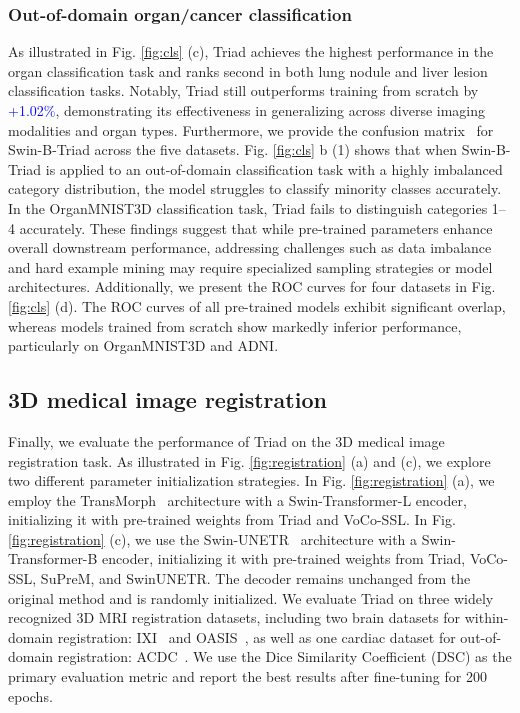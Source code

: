 \subsubsection{Out-of-domain organ/cancer classification}
As illustrated in Fig. \ref{fig:cls} (c), Triad achieves the highest performance in the organ classification task and ranks second in both lung nodule and liver lesion classification tasks.
Notably, Triad still outperforms training from scratch by \textcolor{blue}{+1.02\%}, demonstrating its effectiveness in generalizing across diverse imaging modalities and organ types.
Furthermore, we provide the confusion matrix~\cite{heydarian2022mlcm} for Swin-B-Triad across the five datasets.
Fig. \ref{fig:cls} b (1) shows that when Swin-B-Triad is applied to an out-of-domain classification task with a highly imbalanced category distribution, the model struggles to classify minority classes accurately.
In the OrganMNIST3D classification task, Triad fails to distinguish categories 1–4 accurately.
These findings suggest that while pre-trained parameters enhance overall downstream performance, addressing challenges such as data imbalance and hard example mining may require specialized sampling strategies or model architectures.
Additionally, we present the ROC curves for four datasets in Fig. \ref{fig:cls} (d).
The ROC curves of all pre-trained models exhibit significant overlap, whereas models trained from scratch show markedly inferior performance, particularly on OrganMNIST3D and ADNI.

\subsection{3D medical image registration}

Finally, we evaluate the performance of Triad on the 3D medical image registration task.
As illustrated in Fig. \ref{fig:registration} (a) and (c), we explore two different parameter initialization strategies.
In Fig. \ref{fig:registration} (a), we employ the TransMorph~\citep{chen2022transmorph} architecture with a Swin-Transformer-L encoder, initializing it with pre-trained weights from Triad and VoCo-SSL.
In Fig. \ref{fig:registration} (c), we use the Swin-UNETR~\citep{hatamizadeh2021swin} architecture with a Swin-Transformer-B encoder, initializing it with pre-trained weights from Triad, VoCo-SSL, SuPreM, and SwinUNETR.
The decoder remains unchanged from the original method and is randomly initialized.
We evaluate Triad on three widely recognized 3D MRI registration datasets, including two brain datasets for within-domain registration: IXI~\cite{Brain-Development_IXI_2019} and OASIS~\cite{krentzel2023clem}, as well as one cardiac dataset for out-of-domain registration: ACDC~\cite{bernard2018deep}.
We use the Dice Similarity Coefficient (DSC) as the primary evaluation metric and report the best results after fine-tuning for 200 epochs.

